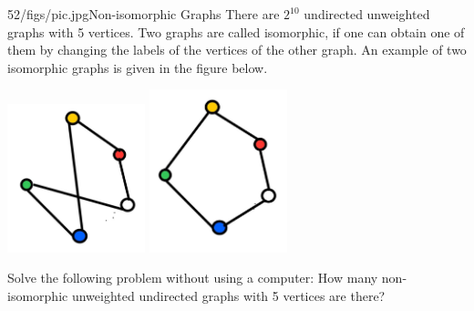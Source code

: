 \begin{problem}{52/figs/pic.jpg}{Non-isomorphic Graphs}  There are $2^{10}$ undirected unweighted graphs with 5 vertices. Two graphs are called isomorphic, if one can obtain one of them by changing the labels of the vertices of the other graph. An example of two isomorphic graphs is given in the figure below.

\begin{center}
	\includegraphics[width=4cm]{52/figs/52_p1.jpg}	\includegraphics[width=4cm]{52/figs/52_p2.jpg}
\end{center}	

Solve the following problem without using a computer: How many non-isomorphic unweighted undirected graphs with 5 vertices are there?
\end{problem}